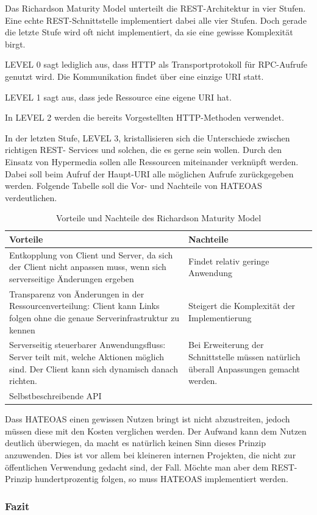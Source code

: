 Das Richardson Maturity Model unterteilt die REST-Architektur in vier Stufen. Eine echte
REST-Schnittstelle implementiert dabei alle vier Stufen. Doch gerade die letzte Stufe wird oft
nicht implementiert, da sie eine gewisse Komplexität birgt.

LEVEL 0 sagt lediglich aus, dass HTTP als Transportprotokoll für RPC-Aufrufe genutzt wird.
Die Kommunikation findet über eine einzige URI statt.

LEVEL 1 sagt aus, dass jede Ressource eine eigene URI hat.

In LEVEL 2 werden die bereits Vorgestellten HTTP-Methoden verwendet.

In der letzten Stufe, LEVEL 3, kristallisieren sich die Unterschiede zwischen richtigen REST-
Services und solchen, die es gerne sein wollen. Durch den Einsatz von Hypermedia sollen alle
Ressourcen miteinander verknüpft werden. Dabei soll beim Aufruf der Haupt-URI alle
möglichen Aufrufe zurückgegeben werden. Folgende Tabelle soll die Vor- und Nachteile von
HATEOAS verdeutlichen.
\newline

\begin{table}[H]
	\begin{tabular}{ | p{7cm} | p{7cm} | }	
		\hline	
		Vorteile & Nachteile \\  \hline	
		Entkopplung von Client und Server, da sich der Client nicht anpassen muss,
		wenn sich serverseitige Änderungen ergeben & 
		Findet relativ geringe Anwendung	 \\ \hline
		Transparenz von Änderungen in der Ressourcenverteilung: 
		Client kann Links folgen ohne die genaue Serverinfrastruktur zu kennen 
		& Steigert die Komplexität der Implementierung \\ \hline
		Serverseitig steuerbarer Anwendungsfluss: Server teilt mit, welche Aktionen möglich sind. 
		Der Client kann sich dynamisch danach richten.
		 & Bei Erweiterung der Schnittstelle müssen natürlich überall Anpassungen gemacht werden. \\ \hline
		Selbstbeschreibende API &  \\ \hline
	\end{tabular}
	\caption{Vorteile und Nachteile des Richardson Maturity Model}
\end{table}

Dass HATEOAS einen gewissen Nutzen bringt ist nicht abzustreiten, jedoch müssen diese mit den Kosten verglichen werden. Der Aufwand kann dem Nutzen deutlich überwiegen, da macht es natürlich keinen Sinn dieses Prinzip anzuwenden. Dies ist vor allem bei kleineren internen Projekten, die nicht zur öffentlichen Verwendung gedacht sind, der Fall. Möchte man aber dem REST-Prinzip hundertprozentig folgen, so muss HATEOAS implementiert werden.


\subsubsection{Fazit}
\label{sec:RESTFazit}
